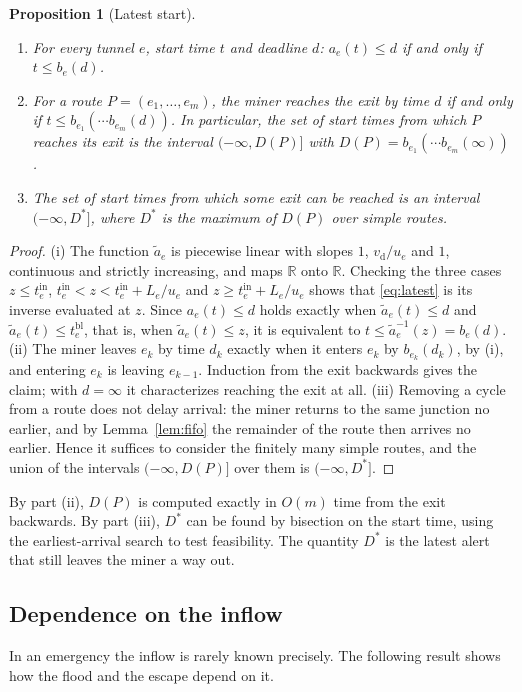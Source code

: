 \documentclass[11pt,a4paper]{article}
\theoremstyle{plain}
\newtheorem{proposition}{Proposition}
\theoremstyle{definition}
\theoremstyle{remark}
\newcommand{\tin}{t^{\mathrm{in}}}
\newcommand{\tbl}{t^{\mathrm{bl}}}
\newcommand{\vd}{v_{\mathrm{d}}}
\begin{document}
\begin{proposition}[Latest start]\label{prop:latest}
\begin{enumerate}[label=(\roman*), leftmargin=2em, itemsep=1pt, topsep=2pt]
  \item For every tunnel $e$, start time $t$ and deadline $d$: $a_e(t) \le d$ if and only if $t \le b_e(d)$.
  \item For a route $P = (e_1, \dots, e_m)$, the miner reaches the exit by time $d$ if and only if $t \le b_{e_1}(\cdots b_{e_m}(d))$. In particular, the set of start times from which $P$ reaches its exit is the interval $(-\infty, D(P)]$ with $D(P) = b_{e_1}(\cdots b_{e_m}(\infty))$.
  \item The set of start times from which some exit can be reached is an interval $(-\infty, D^*]$, where $D^*$ is the maximum of $D(P)$ over simple routes.
\end{enumerate}
\end{proposition}
\begin{proof}
(i) The function $\tilde a_e$ is piecewise linear with slopes $1$, $\vd/u_e$ and $1$, continuous and strictly increasing, and maps $\mathbb{R}$ onto $\mathbb{R}$. Checking the three cases $z \le \tin_e$, $\tin_e < z < \tin_e + L_e/u_e$ and $z \ge \tin_e + L_e/u_e$ shows that \eqref{eq:latest} is its inverse evaluated at $z$. Since $a_e(t) \le d$ holds exactly when $\tilde a_e(t) \le d$ and $\tilde a_e(t) \le \tbl_e$, that is, when $\tilde a_e(t) \le z$, it is equivalent to $t \le \tilde a_e^{-1}(z) = b_e(d)$.
(ii) The miner leaves $e_k$ by time $d_k$ exactly when it enters $e_k$ by $b_{e_k}(d_k)$, by (i), and entering $e_k$ is leaving $e_{k-1}$. Induction from the exit backwards gives the claim; with $d = \infty$ it characterizes reaching the exit at all.
(iii) Removing a cycle from a route does not delay arrival: the miner returns to the same junction no earlier, and by Lemma~\ref{lem:fifo} the remainder of the route then arrives no earlier. Hence it suffices to consider the finitely many simple routes, and the union of the intervals $(-\infty, D(P)]$ over them is $(-\infty, D^*]$.
\end{proof}

By part (ii), $D(P)$ is computed exactly in $O(m)$ time from the exit backwards. By part (iii), $D^*$ can be found by bisection on the start time, using the earliest-arrival search to test feasibility. The quantity $D^*$ is the latest alert that still leaves the miner a way out.

\subsection{Dependence on the inflow}\label{sec:inflow}
In an emergency the inflow is rarely known precisely. The following result shows how the flood and the escape depend on it.
\end{document}
